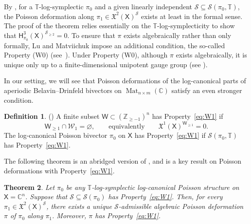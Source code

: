 \documentclass[11pt]{article}
\DeclareMathOperator{\Mat}{Mat}
\newtheorem{theorem}{Theorem}[section]
\theoremstyle{definition}\newtheorem{definition}[theorem]{Definition}
\theoremstyle{definition}\newtheorem{remark}[theorem]{Remark}
\theoremstyle{remark}
\numberwithin{equation}{section}
\begin{document}
By \cite[Theorem 2.3.4]{lm-deform}, for a $\mathbb{T}$-log-symplectic $\pi_0$ and a given linearly independent $\mathcal{S} \subseteq \mathcal{S}(\pi_0,\mathbb{T})$, the Poisson deformation along $\pi_1 \in \mathfrak{X}^2(\mathsf{X})^{\mathcal{S}}$ exists at least in the formal sense. The proof of the theorem relies essentially on the $\mathbb{T}$-log-symplecticity to show that $\mathsf{H}^3_{\pi_0}(\mathsf{X})^{\mathcal{S}_{\geq 2}} = 0$. To ensure that $\pi$ exists algebraically rather than only formally, Lu and Matviichuk impose an additional condition, the so-called Property (W0) (see~\cite[Definition 3.1.7]{lm-deform}). Under Property (W0), although $\pi$ exists algebraically, it is unique only up to a finite-dimensional unipotent gauge group (see \cite[Theorem 3.2.4]{lm-deform}).

In our setting, we will see that Poisson deformations of the log-canonical parts of aperiodic Belavin--Drinfeld bivectors on $\Mat_{n\times m}(\mathbb{C})$ satisfy an even stronger condition.

\begin{definition}(\cite[Definition 3.3.1]{lm-deform})
    A finite subset $\mathsf{W} \subset (\mathbb{Z}_{\geq -1})^n$ has Property~\eqref{eq:W1} if
    \begin{equation}\label{eq:W1}
    \mathsf{W}_{\geq 1}\cap \mathcal{W}_1=\varnothing,
    \qquad\text{equivalently}\qquad
    \mathfrak{X}^1(\mathsf{X})^{\mathsf{W}_{\geq 1}}=0.
    \tag{W1}
    \end{equation}
    The log-canonical Poisson bivector $\pi_0$ on $\mathsf{X}$ has Property~\eqref{eq:W1} if $\mathcal{S}(\pi_0,\mathbb{T})$ has Property~\eqref{eq:W1}.
\end{definition}

The following theorem is an abridged version of \cite[Theorem 3.3.10]{lm-deform}, and is a key result on Poisson deformations with Property~\eqref{eq:W1}.

\begin{theorem}\label{thm:W1}
Let \(\pi_0\) be any \(\mathbb{T}\)-log-symplectic log-canonical Poisson structure on
\(\mathsf{X}=\mathbb{C}^n\).
Suppose that \(\mathcal{S}\subseteq \mathcal{S}(\pi_0)\) has Property~\eqref{eq:W1}. Then, for every
\(\pi_1\in \mathfrak{X}^2(\mathsf{X})^{\mathcal{S}}\),
there exists a unique \(\mathcal{S}\)-admissible algebraic Poisson deformation
\(\pi\) of \(\pi_0\) along \(\pi_1\). Moreover, \(\pi\) has Property~\eqref{eq:W1}.
\end{theorem}
\end{document}
